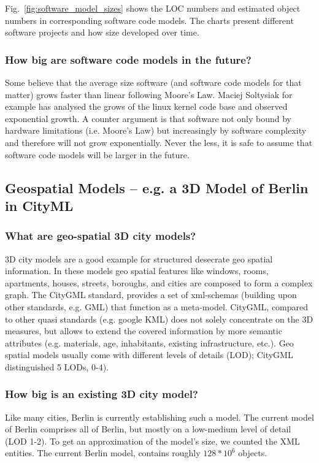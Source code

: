 Fig.~\ref{fig:software_model_sizes} shows the LOC numbers and estimated object numbers in corresponding software code models. The charts present different software projects and how size developed over time. 

\subsubsection{How big are software code models in the future?}

Some believe that the average size software (and software code models for that matter) grows faster than linear following Moore's Law. Maciej Soltysiak for example has analysed the grows of the linux kernel code base and observed exponential growth. A counter argument is that software not only bound by hardware limitations (i.e. Moore's Law) but increasingly by software complexity and therefore will not grow exponentially. Never the less, it is safe to assume that software code models will be larger in the future.


\subsection{Geospatial Models -- e.g. a 3D Model of Berlin in CityML}

\subsubsection{What are geo-spatial 3D city models?}
3D city models are a good example for structured desecrate geo spatial information. In these models geo spatial features like windows, rooms, apartments, houses, streets, boroughs, and cities are composed to form a complex graph. The CityGML standard, provides a set of xml-schemas (building upon other standards, e.g. GML) that function as a meta-model. CityGML, compared to other quasi standards (e.g. google KML) does not solely concentrate on the 3D measures, but allows to extend the covered information by more semantic attributes (e.g. materials, age, inhabitants, existing infrastructure, etc.). Geo spatial models usually come with different levels of details (LOD); CityGML distinguished 5 LODs, 0-4). 

\subsubsection{How big is an existing 3D city model?}
Like many cities, Berlin is currently establishing such a model. The current model of Berlin comprises all of Berlin, but mostly on a low-medium level of detail (LOD 1-2). To get an approximation of the model's size, we counted the XML entities. The current Berlin model, contains roughly $128*10^6$ objects. 

